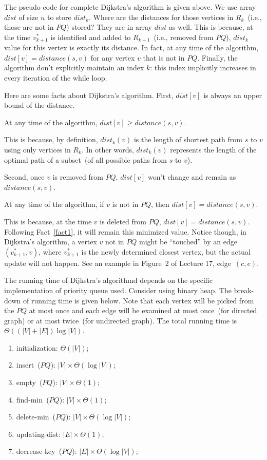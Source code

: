 The pseudo-code for complete Dijkstra's algorithm is given above.
We use array $dist$ of size $n$ to store $dist_k$.
Where are the distances for those vertices in $R_k$~(i.e., those are not in $PQ$) stored?
They are in array $dist$ as well.
This is because, at the time $v_{k+1}^*$ is identified and added to $R_{k+1}$~(i.e., removed from $PQ$),
$dist_k$ value for this vertex is exactly its distance.
In fact, at any time of the algorithm, $dist[v] = distance(s,v)$ for any vertex $v$ that is not in $PQ$.
Finally, the algorithm don't explicitly maintain an index $k$: this index implicitly increases in every iteration of the while loop.


Here are some facts about Dijkstra's algorithm.
First, $dist[v]$ is always an upper bound of the distance.
\begin{fact} \label{fact1}
At any time of the algorithm, $dist[v] \ge distance(s,v)$.
\end{fact}

This is because, by definition, $dist_k(v)$ is the length of 
shortest path from $s$ to $v$ using only vertices in $R_k$.
In other words, $dist_k(v)$ represents the length of the optimal
path of a subset~(of all possible paths from $s$ to $v$).

Second, once $v$ is removed from $PQ$, $dist[v]$ won't change and remain as $distance(s,v)$.
\begin{fact}
At any time of the algorithm, if $v$ is not in $PQ$, then $dist[v] = distance(s,v)$.
\end{fact}
This is because, at the time $v$ is deleted from $PQ$, $dist[v] = distance(s,v)$.
Following Fact~\ref{fact1}, it will remain this minimized value.
Notice though, in Dijkstra's algorithm, a vertex $v$ not in $PQ$ might be ``touched''
by an edge $(v^*_{k+1}, v)$, where $v^*_{k+1}$ is the newly determined closest vertex,
   but the actual update will not happen.
See an example in Figure~2 of Lecture 17, edge~$(c, e)$.

The running time of Dijkstra's algorithmd depends on the specific implementation of priority queue used.
Consider using binary heap. The break-down of running time is given below.
Note that each vertex will be picked from the $PQ$ at most once and each edge will be examined at most once~(for directed graph) or at most twice~(for undirected graph).
The total running time is $\Theta((|V|+|E|)\log |V|)$.
\vspace*{-\topsep}
\begin{enumerate}
\item initialization: $\Theta(|V|)$;
\item insert~($PQ$): $|V| \times \Theta(\log |V|)$;
\item empty~($PQ$): $|V| \times \Theta(1)$;
\item find-min~($PQ$): $|V| \times \Theta(1)$;
\item delete-min~($PQ$): $|V| \times \Theta(\log |V|)$;
\item updating-dist: $|E| \times \Theta(1)$;
\item decrease-key~($PQ$): $|E| \times \Theta(\log |V|)$;
\end{enumerate}


